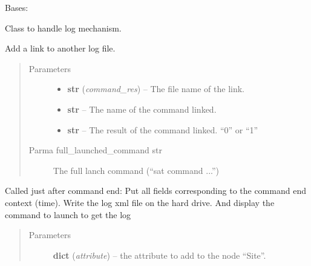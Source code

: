 \documentclass[a4paper,10pt,english]{sphinxmanual}
\begin{document}
\begin{fulllineitems}
\label{commands/apidoc/src:src.logger.Logger}
Bases: 

Class to handle log mechanism.

\begin{fulllineitems}
\label{commands/apidoc/src:src.logger.Logger.add_link}
Add a link to another log file.
\begin{quote}\begin{description}
\item[{Parameters}] \leavevmode\begin{itemize}
\item {} 
\textbf{str} (\emph{command\_res}) -- The file name of the link.

\item {} 
\textbf{str} -- The name of the command linked.

\item {} 
\textbf{str} -- The result of the command linked. ``0'' or ``1''

\end{itemize}

\item[{Parma full\_launched\_command str}] \leavevmode
The full lanch command 
(``sat command ...'')

\end{description}\end{quote}

\end{fulllineitems}


\begin{fulllineitems}
\label{commands/apidoc/src:src.logger.Logger.end_write}
Called just after command end: Put all fields 
corresponding to the command end context (time).
Write the log xml file on the hard drive.
And display the command to launch to get the log
\begin{quote}\begin{description}
\item[{Parameters}] \leavevmode
\textbf{dict} (\emph{attribute}) -- the attribute to add to the node ``Site''.


\end{description}
\end{quote}
\end{fulllineitems}
\end{fulllineitems}
\end{document}
